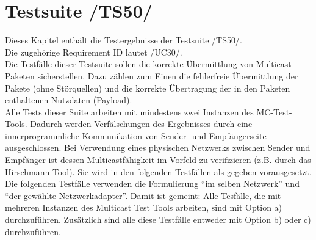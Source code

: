 \chapter{Testsuite /TS50/}

    Dieses Kapitel enthält die Testergebnisse der Testsuite /TS50/.\\
    Die zugehörige Requirement ID lautet /UC30/.\\
    \newline
    Die Testfälle dieser Testsuite sollen die korrekte Übermittlung von
    Multicast-Paketen sicherstellen. Dazu zählen zum Einen die fehlerfreie
    Übermittlung der Pakete (ohne Störquellen) und die korrekte Übertragung der
    in den Paketen enthaltenen Nutzdaten (Payload).\\
    \newline
    Alle Tests dieser Suite arbeiten mit mindestens zwei Instanzen des
    MC-Test-Tools. Dadurch werden Verfälschungen des Ergebnisses durch eine
    innerprogrammliche Kommunikation von Sender- und Empfängerseite
    ausgeschlossen. Bei Verwendung eines physischen Netzwerks
    zwischen Sender und Empfänger ist dessen Multicastfähigkeit im Vorfeld zu
    verifizieren (z.B. durch das Hirschmann-Tool). Sie wird in den folgenden
    Testfällen als gegeben vorausgesetzt.\\
    \newline
    Die folgenden Testfälle verwenden die Formulierung "`im selben Netzwerk"'
    und "`der gewählte Netzwerkadapter"'. Damit ist gemeint:
    Alle Tesfälle, die mit mehreren Instanzen des Multicast Test Tools arbeiten,
    sind mit Option a) durchzuführen. Zusätzlich sind alle diese Testfälle
    entweder mit Option b) oder c) durchzuführen.

